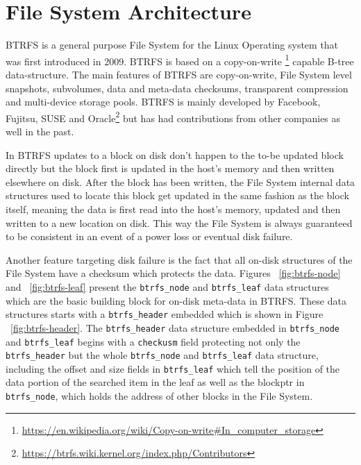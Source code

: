 \documentclass[10pt]{article}
\begin{document}

\section{File System Architecture}
BTRFS\cite{BTRFS} is a general purpose File System for the Linux Operating
system that was first introduced in 2009. BTRFS is based on a copy-on-write
\footnote{\href{https://en.wikipedia.org/wiki/Copy-on-write\#In\_computer\_storage}
{https://en.wikipedia.org/wiki/Copy-on-write\#In\_computer\_storage}} capable
B-tree\cite{rodeh} data-structure. The main features of BTRFS are
copy-on-write, File System level snapshots, subvolumes, data and meta-data
checksums, transparent compression and multi-device storage pools. BTRFS is
mainly developed by Facebook, Fujitsu, SUSE and
Oracle\footnote{\href{https://btrfs.wiki.kernel.org/index.php/Contributors}
{https://btrfs.wiki.kernel.org/index.php/Contributors}} but has had
contributions from other companies as well in the past.

In BTRFS updates to a block on disk don't happen to the to-be updated block
directly but the block first is updated in the host's memory and then written
elsewhere on disk. After the block has been written, the File System internal
data structures used to locate this block get updated in the same fashion as
the block itself, meaning the data is first read into the host's memory,
updated and then written to a new location on disk. This way the File System
is always guaranteed to be consistent in an event of a power loss or eventual
disk failure. 

Another feature targeting disk failure is the fact that all on-disk structures
of the File System have a checksum which protects the data. Figures
~\ref{fig:btrfs-node} and ~\ref{fig:btrfs-leaf} present the
\texttt{btrfs\_node} and \texttt{btrfs\_leaf} data structures which are the
basic building block for on-disk meta-data in BTRFS. These data structures
starts with a \texttt{btrfs\_header} embedded which is shown in Figure
~\ref{fig:btrfs-header}. The \texttt{btrfs\_header} data structure embedded in
\texttt{btrfs\_node} and \texttt{btrfs\_leaf} begins with a \texttt{checkusm}
field protecting not only the \texttt{btrfs\_header} but the whole
\texttt{btrfs\_node} and \texttt{btrfs\_leaf} data structure, including the
offset and size fields in \texttt{btrfs\_leaf} which tell the position of the
data portion of the searched item in the leaf as well as the blockptr in
\texttt{btrfs\_node}, which holds the address of other blocks in the File
System.
\end{document}
